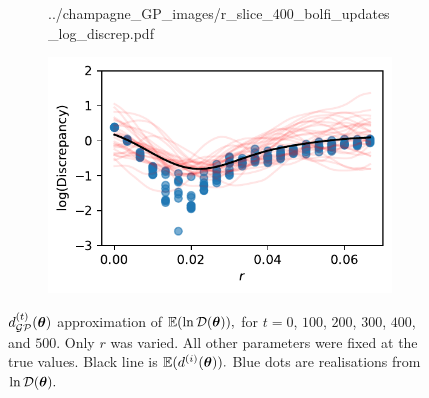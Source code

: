 \begin{figure}[htbp]
\begin{subfigure}[b]{0.5\textwidth}
{            ../champagne_GP_images/r_slice_400_bolfi_updates_log_discrep.pdf
        }
    \end{subfigure}%
    \hfill%
    \begin{subfigure}[b]{0.5\textwidth}
        \centering
        \includegraphics[width=\textwidth]{
            ../champagne_GP_images/r_slice_500_bolfi_updates_log_discrep.pdf
        }
    \end{subfigure}
    \caption{
        $d_{\mathcal{GP}}^{(t)}(\bm{\theta})$ approximation of $\operatorname{\mathbb{E}}(\ln\mathcal{D}(\bm{\theta})),$ 
        for $t= 0$, $100$, $200$, $300$, $400$, and $500.$ Only $r$ was 
        varied. All other parameters were fixed at the true values. Black line 
        is
        $\operatorname{\mathbb{E}}(d^{(i)}(\bm{\theta})).$
        Blue dots are realisations from $\ln\mathcal{D}(\bm{\theta}).$
    }
\end{figure}